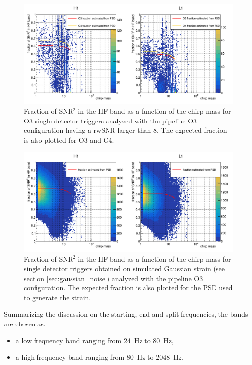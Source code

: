 \begin{figure}[ht]
  \centering
  \includegraphics[width=\textwidth]{sectionMBTA/cSnrFracMchirp.png}
  \caption{Fraction of SNR$^2$ in the HF band as a function of the chirp mass for O3 single detector triggers analyzed with the pipeline O3 configuration having a rwSNR larger than 8. The expected fraction is also plotted for O3 and O4.}
  \label{fig:O3_snr_sharing}
\end{figure}

\begin{figure}[ht]
  \centering
  \includegraphics[width=\textwidth]{sectionMBTA/cSnrFracMchirpGaus.png}
  \caption{Fraction of SNR$^2$ in the HF band as a function of the chirp mass for single detector triggers obtained on simulated Gaussian strain (see section \ref{sec:gaussian_noise}) analyzed with the pipeline O3 configuration. The expected fraction is also plotted for the PSD used to generate the strain.}
  \label{fig:O3_snr_sharing_Gaus}
\end{figure}

Summarizing the discussion on the starting, end and split frequencies, the bands are chosen as:
%
\begin{itemize}
\item a low frequency band ranging from \SI{24}{\hertz} to \SI{80}{\hertz},
\item a high frequency band ranging from \SI{80}{\hertz} to \SI{2048}{\hertz}.
\end{itemize}

